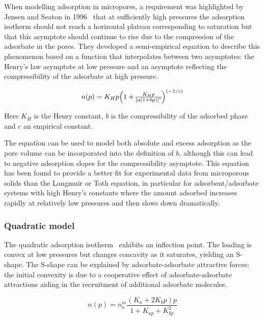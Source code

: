 When modelling adsorption in micropores, a requirement was highlighted by
Jensen and Seaton in 1996~\cite{jensenIsothermEquationAdsorption1996} 
that at sufficiently high pressures the adsorption
isotherm should not reach a horizontal plateau corresponding to saturation but
that this asymptote should continue to rise due to the compression 
of the adsorbate in the pores. They developed a semi-empirical equation
to describe this phenomenon based on a function that interpolates between
two asymptotes: the Henry’s law asymptote at low pressure and an
asymptote reflecting the compressibility of the adsorbate at
high pressure.

\begin{equation}\label{pyg:eqn:jseaton}
    n(p) = K_H p \Big{(1 + \frac{K_H p}{{[a {(1 + b p)}]}^c}\Big)}^{(-1/c)}
\end{equation}

Here \(K_H\) is the Henry constant, \(b\) is the compressibility of the
adsorbed phase and \(c\) an empirical constant.

The equation can be used to model both absolute and excess adsorption as the pore
volume can be incorporated into the definition of \(b\), although this can lead
to negative adsorption slopes for the compressibility asymptote.
This equation has been found to provide a better fit for experimental data
from microporous solids than the Langmuir or Toth equation, in particular for
adsorbent/adsorbate systems with high Henry’s constants where the amount adsorbed
increases rapidly at relatively low pressures and then slows down dramatically.

\subsubsection{Quadratic model}\label{pyg:models:quadratic}

The quadratic adsorption isotherm~\cite{hillIntroductionStatisticalThermodynamics1986} 
exhibits an inflection point. The loading is convex at low 
pressures but changes concavity as it saturates, yielding
an S-shape. The S-shape can be explained by adsorbate-adsorbate attractive
forces; the initial convexity is due to a cooperative
effect of adsorbate-adsorbate attractions aiding in the recruitment of
additional adsorbate molecules.

\begin{equation}\label{pyg:eqn:quad}
    n(p) = n_a^m \frac{(K_a + 2 K_b p)p}{1+K_{ap} + K_{bp}^2}
\end{equation}

